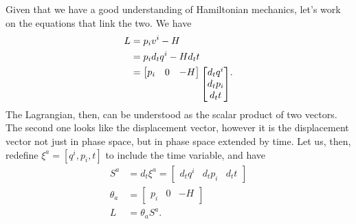Given that we have a good understanding of Hamiltonian mechanics, let's work on the equations that link the two. We have
\begin{equation}
	\begin{aligned}
		L &= p_i v^i - H \\
		&= p_i d_t q^i - H d_t t \\
		&= 
		\begin{bmatrix}
			p_i & 0 & -H
		\end{bmatrix} 
	\raisebox{-1.2em}{$
		\begin{bmatrix}
			d_t q^i \\
			d_t p_i \\
			d_t t
		\end{bmatrix}
		$}.
	\end{aligned}
\end{equation}
The Lagrangian, then, can be understood as the scalar product of two vectors. The second one looks like the displacement vector, however it is the displacement vector not just in phase space, but in phase space extended by time. Let us, then, redefine $\xi^a = [q^i, p_i , t]$ to include the time variable, and have
\begin{equation}
	\begin{aligned}
		S^a &= d_t \xi^a = \begin{bmatrix}
			d_t q^i & d_t p_i & d_t t
		\end{bmatrix} \\
		\theta_a &= \begin{bmatrix}
			p_i & 0 & - H
		\end{bmatrix} \\
		L &= \theta_a S^a.
	\end{aligned}
\end{equation}

